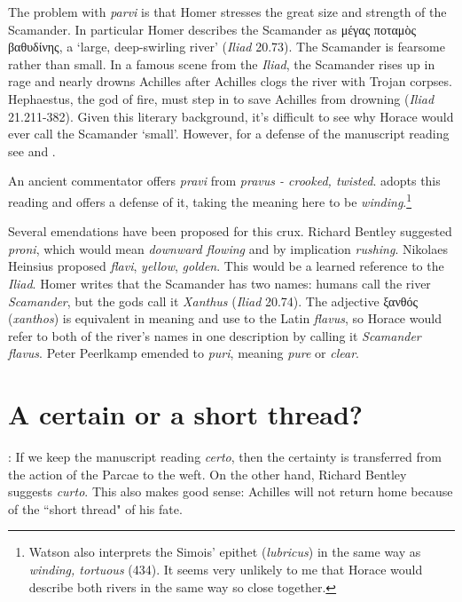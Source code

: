The problem with \textit{parvi} is that Homer stresses the great size and strength of the Scamander.  In particular Homer describes the Scamander as μέγας ποταμὸς βαθυδίνης, a `large, deep-swirling river' (\textit{Iliad} 20.73).  The Scamander is fearsome rather than small.  In a famous scene from the \textit{Iliad}, the Scamander rises up in rage and nearly drowns Achilles after Achilles clogs the river with Trojan corpses.  Hephaestus, the god of fire, must step in to save Achilles from drowning (\textit{Iliad} 21.211-382).  Given this literary background, it's difficult to see why Horace would ever call the Scamander `small'.  However, for a defense of the manuscript reading see \citet[223--224]{mankin1995} and \citet[207--209]{gaskin2013}.

An ancient commentator offers \textit{pravi} from \textit{pravus - crooked, twisted}.  \citet[433--434]{watson2003} adopts this reading and offers a defense of it, taking the meaning here to be \textit{winding}.\footnote{Watson also interprets the Simois' epithet (\textit{lubricus}) in the same way as \textit{winding, tortuous} (434).  It seems very unlikely to me that Horace would describe both rivers in the same way so close together.}

Several emendations have been proposed for this crux. Richard Bentley suggested \textit{proni}, which would mean \textit{downward flowing} and by implication \textit{rushing}. Nikolaes Heinsius proposed \textit{flavi}, \textit{yellow}, \textit{golden}. This would be a learned reference to the \textit{Iliad}. Homer writes that the Scamander has two names: humans call the river \textit{Scamander}, but the gods call it \textit{Xanthus} (\textit{Iliad} 20.74). The adjective ξανθός (\textit{xanthos}) is equivalent in meaning and use to the Latin \textit{flavus}, so  Horace would refer to both of the river's names in one description by calling it \textit{Scamander flavus}. Peter Peerlkamp emended to \textit{puri}, meaning \textit{pure} or \textit{clear}.


\section*{A certain or a short thread?}


: If we keep the manuscript reading \textit{certo}, then the certainty is transferred from the action of the Parcae to the weft.  On the other hand, Richard Bentley suggests \textit{curto}.  This also makes good sense: Achilles will not return home because of the ``short thread" of his fate.

